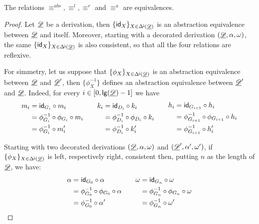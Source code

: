 \begin{proposition}\label{prop:equi}
The relations $\equiv^{abs}, \equiv^l, \equiv^r$ and $\equiv^a$ are equivalences.
\end{proposition}
\begin{proof}
	 
	 Let $\underline{\mathscr{D}}$ be a derivation, then $\{\mathsf{id}_{X}\}_{X\in \Delta^{\hspace{-1pt}\downarrow\hspace{-1pt}}(\underline{\mathscr{D}})}$ is an abstraction equivalence between $\underline{\mathscr{D}}$ and itself. Moreover, starting with a decorated derivation $(\underline{\mathscr{D}}, \alpha, \omega)$, the same $\{\mathsf{id}_{X}\}_{X\in \Delta^{\hspace{-1pt}\downarrow\hspace{-1pt}}(\underline{\mathscr{D}})}$  is also consistent, so that all the four relations are reflexive.
	 
	 For simmetry, let us suppose that $\{\phi_X\}_{X\in \Delta^{\hspace{-1pt}\downarrow\hspace{-1pt}}(\underline{\mathscr{D}})}$ is an abstraction equivalence between $\underline{\mathscr{D}}$ and $\underline{\mathscr{D}}'$, then $\{\phi^{-1}_X\}$ defines an abstraction equivalence  between $\underline{\mathscr{D}}'$ and $\underline{\mathscr{D}}$. Indeed, for every $i\in [0, \mathsf{lg}(\underline{\mathscr{D}})-1]$ we have
	 \[\begin{split}
	 	m_i&=\mathsf{id}_{G_i}\circ m_i\\&=\phi^{-1}_{G_i}\circ \phi_{G_i}\circ m_i\\&=\phi^{-1}_{G_i}\circ m'_i
	 \end{split} \qquad \begin{split}
 	k_i&=\mathsf{id}_{D_i}\circ k_i\\&=\phi^{-1}_{D_i}\circ \phi_{D_i}\circ k_i\\&=\phi^{-1}_{D_i}\circ k'_i
	 \end{split}\qquad \begin{split}
 	h_i&=\mathsf{id}_{G_{i+1}}\circ h_i\\&=\phi^{-1}_{G_{i+1}}\circ \phi_{G_{i+1}}\circ h_i\\&=\phi^{-1}_{G_{i+1}}\circ h'_i
	 \end{split} \]
	
	Starting with two decorated derivations $(\underline{\mathscr{D}}, \alpha, \omega)$ and $(\underline{\mathscr{D}}', \alpha', \omega')$, if $\{\phi_X\}_{X\in \Delta^{\hspace{-1pt}\downarrow\hspace{-1pt}}(\underline{\mathscr{D}})}$  is left, respectively right, consistent  then, putting $n$ as the length of $\underline{\mathscr{D}}$, we have:
	\[\begin{split}
		\alpha&=\mathsf{id}_{G_0}\circ \alpha\\&=\phi^{-1}_{G_0}\circ \phi_{G_0}\circ \alpha\\&=\phi^{-1}_{G_0}\circ \alpha'
	\end{split}\qquad \begin{split}
		\omega&=\mathsf{id}_{G_n}\circ \omega\\&=\phi^{-1}_{G_n}\circ \phi_{G_n}\circ \omega\\&=\phi^{-1}_{G_n}\circ \omega'
	\end{split}\]
	

\end{proof}
